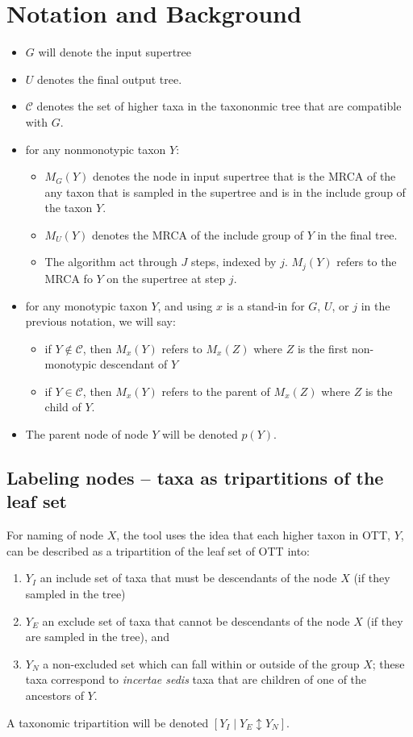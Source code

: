 \documentclass[english]{article}
\newcommand{\parent}[1]{p(#1)}
\newcommand{\tripartition}[1]{\left[{#1}_I \mid {#1}_E \updownarrow {#1}_N\right]}
\newcommand{\incsed}[0]{{\em incertae sedis}\xspace}
\begin{document}
\section{Notation and Background}
\begin{itemize}
    \item $G$ will denote the input supertree
    \item $U$  denotes the final output tree.
    \item $\mathcal{C}$ denotes the set of higher taxa in the taxononmic tree
        that are compatible with $G$.
    \item for any nonmonotypic taxon $Y$:
    \begin{itemize}
        \item $M_G(Y)$ denotes the node in input supertree that is the MRCA of
            the any taxon that is sampled in the supertree and is in the
            include group of the taxon $Y$.
        \item $M_U(Y)$ denotes the MRCA of the include group of $Y$ in the final tree.
        \item The algorithm act through $J$ steps, indexed by $j$.
            $M_j(Y)$ refers to the MRCA fo $Y$ on the supertree at step $j$.
    \end{itemize}
    \item for any monotypic taxon $Y$, and using $x$ is a stand-in for $G$, $U$, or $j$ in the previous notation, we will say:
    \begin{itemize}
        \item if $Y\notin\mathcal{C}$, then $M_x(Y)$ refers
            to $M_x(Z)$ where $Z$ is the first non-monotypic descendant of $Y$
        \item if $Y \in \mathcal{C}$, then $M_x(Y)$ refers
            to the parent of $M_x(Z)$ where $Z$ is the child of $Y$.
    \end{itemize}
    \item The parent node of node $Y$ will be denoted $\parent{Y}$.
\end{itemize}

\subsection{Labeling nodes -- taxa as tripartitions of the leaf set}
For naming of node $X$, the tool uses the idea that each higher taxon in OTT, $Y$, can
    be described as a tripartition of the leaf set of OTT into:
\begin{enumerate}
    \item $Y_I$ an include set of taxa that must be descendants of the node $X$ (if they sampled in the tree)
    \item $Y_E$ an exclude set of taxa that cannot be descendants of the node $X$ (if they are sampled in the tree), and 
    \item $Y_N$ a non-excluded set which can fall within or outside of the group $X$; these taxa
    correspond to \incsed taxa that are children of one of the ancestors of $Y$.
\end{enumerate}
A taxonomic tripartition will be denoted $\tripartition{Y}$.
\end{document}
